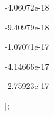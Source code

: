 \begin{DoxyCode}
                                                               
    -4.06072e-18                                                                                           
                                                                                                                  
                    
    -9.40979e-18                                                                                           
                                                                                                                  
                      
    -1.07071e-17                                                                                           
                                                                                                                  
                                                               
    -4.14666e-17                                                                                           
                                                                                                                  
                            
    -2.75923e-17                                                                                           
                                                                                                                  
                                                               
];                                                                                                         
                                                                                                                  

\end{DoxyCode}
